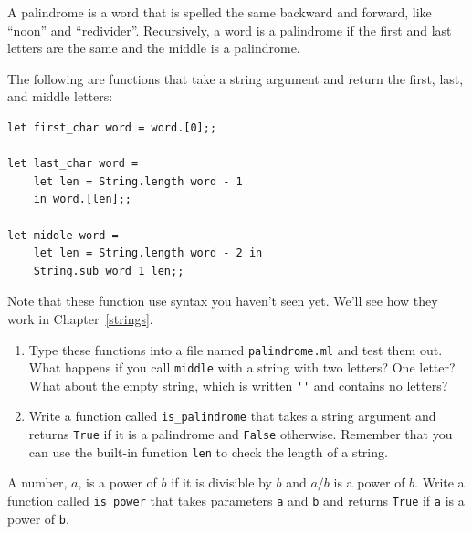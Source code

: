 \documentclass[10pt]{book}
\begin{document}
\begin{ex}
\label{palindrome}


A palindrome is a word that is spelled the same backward and
forward, like ``noon'' and ``redivider''.  Recursively, a word
is a palindrome if the first and last letters are the same
and the middle is a palindrome.

The following are functions that take a string argument and
return the first, last, and middle letters:

\beforeverb
\begin{verbatim}
let first_char word = word.[0];;

let last_char word =
	let len = String.length word - 1
	in word.[len];;

let middle word = 
	let len = String.length word - 2 in
	String.sub word 1 len;;
\end{verbatim}
\afterverb
Note that these function use syntax you haven't seen yet. 
We'll see how they work in Chapter~\ref{strings}.

\begin{enumerate}

\item Type these functions into a file named {\tt palindrome.ml}
and test them out.  What happens if you call {\tt middle} with
a string with two letters?  One letter?  What about the empty
string, which is written \verb"''" and contains no letters?

\item Write a function called \verb"is_palindrome" that takes
a string argument and returns {\tt True} if it is a palindrome
and {\tt False} otherwise.  Remember that you can use the
built-in function {\tt len} to check the length of a string.

\end{enumerate}

\end{ex}

\begin{ex}
A number, $a$, is a power of $b$ if it is divisible by $b$
and $a/b$ is a power of $b$.  Write a function called
\verb"is_power" that takes parameters {\tt a} and {\tt b}
and returns {\tt True} if {\tt a} is a power of {\tt b}.
\end{ex}
\end{document}
